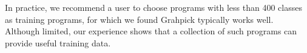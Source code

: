 In practice, we recommend a user to choose programs with less than 400 classes as training programs, for which we found Grahpick typically works well. Although limited, our experience shows that a collection of such programs can provide useful training data.
%
%


